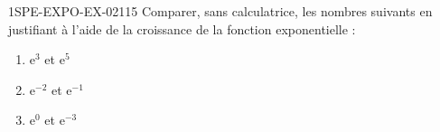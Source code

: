 \begin{exercice}{1SPE-EXPO-EX-021}{1}{5}
Comparer, sans calculatrice, les nombres suivants en justifiant à l'aide de la croissance de la fonction exponentielle :
\begin{enumerate}
  \item $\mathrm{e}^3$ et $\mathrm{e}^5$
  \item $\mathrm{e}^{-2}$ et $\mathrm{e}^{-1}$
  \item $\mathrm{e}^0$ et $\mathrm{e}^{-3}$
\end{enumerate}
\end{exercice}
